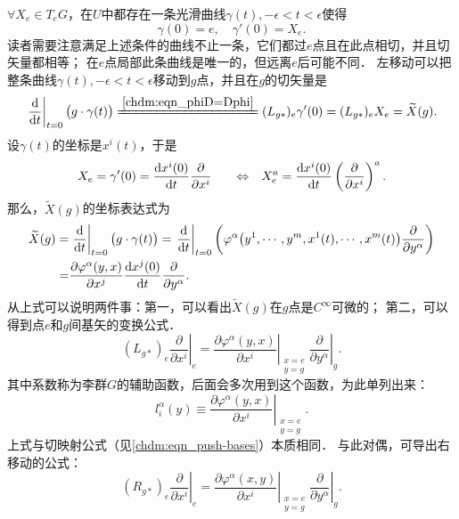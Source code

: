 $\forall X_e \in T_eG$，在$U$中都存在一条光滑曲线$\gamma(t),-\epsilon < t < \epsilon$使得
\begin{equation}
    \gamma(0)=e,\quad \gamma'(0)=X_e .
\end{equation}
读者需要注意满足上述条件的曲线不止一条，它们都过$e$点且在此点相切，并且切矢量都相等；
在$e$点局部此条曲线是唯一的，但远离$e$后可能不同．
左移动可以把整条曲线$\gamma(t),-\epsilon < t < \epsilon$移动到$g$点，并且在$g$的切矢量是
\begin{equation}\label{chlg:eqn_tmpl10}
    \left. \frac{\rm d}{{\rm d}t} \right|_{t=0} \bigl(g\cdot \gamma(t) \bigr)
    \xlongequal{\ref{chdm:eqn_phiD=Dphi}} (L_{g*})_e \gamma'(0) = (L_{g*})_e X_e  = \widetilde{X}(g) .
\end{equation}
设$\gamma(t)$的坐标是$x^i(t)$，于是
\begin{equation}
    X_e =\gamma'(0)= \frac{{\rm d} x^i(0)}{{\rm d}t} \frac{\partial }{\partial x^i}
    \qquad {\Leftrightarrow} \quad
    X^a_e = \frac{{\rm d} x^i(0)}{{\rm d}t} \left(\frac{\partial }{\partial x^i}\right)^a .
\end{equation}
那么，$\widetilde{X}(g)$的坐标表达式为
\begin{align*}
    \widetilde{X}(g)=& \left. \frac{\rm d}{{\rm d}t} \right|_{t=0} \bigl(g\cdot \gamma(t) \bigr)
      =\left. \frac{\rm d}{{\rm d}t} \right|_{t=0} \left( \varphi^\alpha \bigl(y^1,\cdots,y^m, 
      x^1(t),\cdots,x^m(t) \bigr)  \frac{\partial}{\partial y^\alpha} \right) \\
    =& \frac{\partial \varphi^\alpha (y,x)}{\partial x^j} \frac{{\rm d} x^j(0)}{{\rm d}t} 
      \frac{\partial}{\partial y^\alpha} .
\end{align*}
从上式可以说明两件事：第一，可以看出$\widetilde{X}(g)$在$g$点是$C^\infty$可微的；
第二，可以得到点$e$和$g$间基矢的变换公式．
\begin{equation}\label{chlg:eqn_lve}
    (L_{g*})_e\left. \frac{\partial }{\partial x^i }\right|_{e}
    = \left. \frac{\partial \varphi^\alpha (y,x)}{\partial x^i} 
    \right|_{\substack{x=e\\y=g}}   \left. \frac{\partial}{\partial y^\alpha}\right|_{g} .
\end{equation}
其中系数称为李群$G$的{\heiti 辅助函数}，后面会多次用到这个函数，为此单列出来：
\begin{equation}\label{chlg:eqn_auxiliaryfun}
    l^\alpha_i(y)\equiv \left. \frac{\partial \varphi^\alpha (y,x)}
     {\partial x^i}\right|_{\substack{x=e\\y=g}}.
\end{equation} 
上式与切映射公式（见\eqref{chdm:eqn_push-bases}）本质相同．
与此对偶，可导出右移动的公式： %
\begin{equation}\label{chlg:eqn_rve}
    (R_{g*})_e \left. \frac{\partial }{\partial x^i }\right|_{e}
     = \left. \frac{\partial \varphi^\alpha (x,y)}{\partial x^i} 
    \right|_{\substack{x=e\\y=g}}   \left. \frac{\partial}{\partial y^\alpha}\right|_{g} .
\end{equation}


